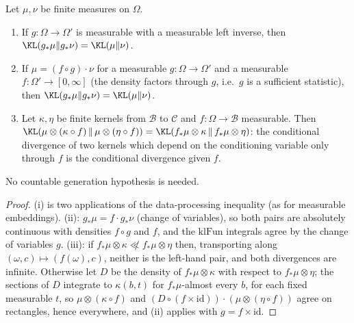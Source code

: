 \begin{lemma}\label{lem:kl_sufficient_statistic}
\leanok
{}
Let $\mu,\nu$ be finite measures on $\Omega$.
\begin{enumerate}
\item[(i)] If $g : \Omega \to \Omega'$ is measurable with a measurable left inverse, then
  $\KL(g_*\mu\|g_*\nu) = \KL(\mu\|\nu)$.
\item[(ii)] If $\mu = (f\circ g)\cdot\nu$ for a measurable $g : \Omega\to\Omega'$ and a measurable
  $f : \Omega' \to [0,\infty]$ (the density factors through $g$, i.e.\ $g$ is a sufficient
  statistic), then $\KL(g_*\mu\|g_*\nu) = \KL(\mu\|\nu)$.
\item[(iii)] Let $\kappa,\eta$ be finite kernels from $\mathcal{B}$ to $\mathcal{C}$ and
  $f : \Omega\to\mathcal{B}$ measurable. Then
  $\KL(\mu\otimes(\kappa\circ f)\,\|\,\mu\otimes(\eta\circ f)) = \KL(f_*\mu\otimes\kappa\,\|\,f_*\mu\otimes\eta)$:
  the conditional divergence of two kernels which depend on the conditioning variable only through
  $f$ is the conditional divergence given $f$.
\end{enumerate}
No countable generation hypothesis is needed.
\end{lemma}

\begin{proof}
\leanok
{}
(i) is two applications of the data-processing inequality (as for measurable embeddings).
(ii): $g_*\mu = f\cdot g_*\nu$ (change of variables), so both pairs are absolutely continuous
with densities $f\circ g$ and $f$, and the $\mathrm{klFun}$ integrals agree by the change of
variables $g$. (iii): if $f_*\mu\otimes\kappa\not\ll f_*\mu\otimes\eta$ then, transporting along
$(\omega,c)\mapsto(f(\omega),c)$, neither is the left-hand pair, and both divergences are
infinite. Otherwise let $D$ be the density of $f_*\mu\otimes\kappa$ with respect to
$f_*\mu\otimes\eta$; the sections of $D$ integrate to $\kappa(b,t)$ for $f_*\mu$-almost every $b$,
for each fixed measurable $t$, so $\mu\otimes(\kappa\circ f)$ and $(D\circ(f\times\mathrm{id}))\cdot(\mu\otimes(\eta\circ f))$
agree on rectangles, hence everywhere, and (ii) applies with $g = f\times\mathrm{id}$.
\end{proof}

